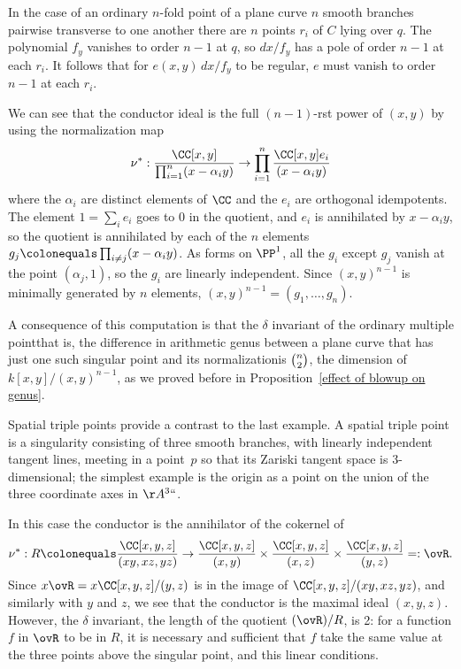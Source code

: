 \begin{example}
In the case of an ordinary $n$-fold point of a plane curve\emdash 
{}
$n$
smooth branches pairwise transverse to one another
\emdash there are
$n$ points
$r_i$ of $C$ lying over $q$. The polynomial $f_y$ vanishes to order $n-1$
at $q$, so $dx/f_y$ has a pole of order $n-1$ at
each $r_i$. It follows that for $e(x,y)\,dx/f_y$ to be regular, $e$ must
vanish to order $n-1$ at each $r_i$.

We can see that the conductor ideal is the full $(n-1)$-rst power of
$(x,y)$ by using the
normalization map
$$
\nu^{*}: \frac{\CC[x,y]}{\prod_{i=1}^{n} (x-\alpha_{i}y)} \to
 \prod_{i=1}^{n} \frac{\CC[x,y]e_{i}}{(x-\alpha_{i}y)}
$$
where the $\alpha_{i}$ are distinct elements of $\CC$ and the $e_{i}$
are orthogonal idempotents.
The element $1 = \sum_{i}e_{i}$ goes to 0 in the quotient, and $e_{i}$
is annihilated by $x-\alpha_{i}y$,
so the quotient is annihilated by each of the $n$ elements $g_{j}
\colonequals  \prod_{i\neq j} (x-\alpha_{i}y)$.
As forms on $\PP^{1}$, all the $g_{i}$ except $g_{j}$ vanish at the
point $(\alpha_{j}, 1)$, so the $g_{i}$ are linearly independent. Since
$(x,y)^{n-1}$ is minimally generated by $n$ elements, $(x,y)^{n-1} =
(g_{1}, \dots, g_{n})$.

A consequence of this computation is that the $\delta$ invariant of the
%
ordinary multiple point\emdash that is, the difference in arithmetic
genus between a plane curve that has just one such singular point
and its normalization\emdash is $\tbinom{n}{2}$, the dimension of
%
$k[x,y]/(x,y)^{n-1}$, as we proved before in 
Proposition~\ref{effect of blowup on genus}.
\end{example}

\begin{example}
Spatial triple points provide a contrast to the last example. A
spatial triple point is a singularity consisting of three smooth
branches, with linearly independent tangent lines, meeting 
in a point~$p$ so that its Zariski tangent space is 3-dimensional; the simplest
example is the origin as a point on the union of the three coordinate
axes in $\AA^3` `$.

In this case the conductor is the annihilator of the cokernel of
\vspace{3pt}
$$
\nu^{*}: R \colonequals  \frac{\CC[x,y,z]}{(xy, xz, yz)} \to
\frac{\CC[x,y,z]}{(x,y)} \times \frac{\CC[x,y,z]}{(x,z)} \times
\frac{\CC[x,y,z]}{(y,z)} =: \ovR.
$$
Since $x\ovR = x \CC[x,y,z]/(y,z)$ is in the image of
$\CC[x,y,z]/(xy, xz, yz)$, and similarly with $y$ and $z$,
we see that the conductor is the maximal ideal $(x,y,z)$. However,
the $\delta$ invariant, the length
%
of the quotient $(\ovR)/R$, is 2: for a function $f$ in $\ovR$ to be in $R$, it
is necessary and sufficient that $f$ take the same value at the three
points above the singular point,
and this 
linear conditions.
\end{example}

